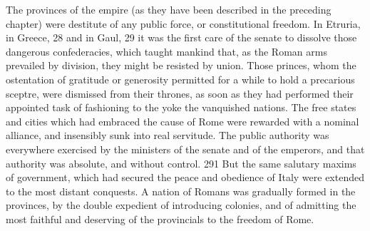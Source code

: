 
The provinces of the empire (as they have been described in the
preceding chapter) were destitute of any public force, or
constitutional freedom. In Etruria, in Greece, 28 and in Gaul, 29
it was the first care of the senate to dissolve those dangerous
confederacies, which taught mankind that, as the Roman arms
prevailed by division, they might be resisted by union. Those
princes, whom the ostentation of gratitude or generosity
permitted for a while to hold a precarious sceptre, were
dismissed from their thrones, as soon as they had performed their
appointed task of fashioning to the yoke the vanquished nations.
The free states and cities which had embraced the cause of Rome
were rewarded with a nominal alliance, and insensibly sunk into
real servitude. The public authority was everywhere exercised by
the ministers of the senate and of the emperors, and that
authority was absolute, and without control. 291 But the same
salutary maxims of government, which had secured the peace and
obedience of Italy were extended to the most distant conquests. A
nation of Romans was gradually formed in the provinces, by the
double expedient of introducing colonies, and of admitting the
most faithful and deserving of the provincials to the freedom of
Rome.




